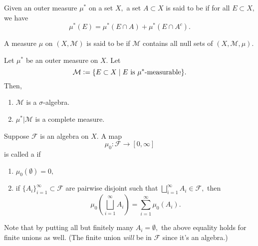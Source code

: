 \documentclass[12pt]{article}	%
\begin{document}
\begin{defn}[$\mu^*$-measurable]
	Given an outer measure $\mu^*$ on a set $X,$ a set $A \subset X$ is said to be  if for all $E \subset X,$ we have
	\begin{equation*} 
		\mu^*(E) = \mu^*(E \cap A) + \mu^*(E \cap A^c).
	\end{equation*}
\end{defn}

\begin{defn}
	A measure $\mu$ on $(X, \mathcal{M})$ is said to be  if $\mathcal{M}$ contains all null sets of $(X, \mathcal{M}, \mu).$
\end{defn}

\begin{thm}[Carathéodory]
	Let $\mu^*$ be an outer measure on $X.$ Let
	\begin{equation*} 
		\mathcal{M} \vcentcolon= \{E \subset X \mid E \text{ is } \mu^*\text{-measurable}\}.
	\end{equation*}
	Then,
	\begin{enumerate}
		\item $\mathcal{M}$ is a $\sigma$-algebra.
		\item $\mu^*|\mathcal{M}$ is a complete measure.
	\end{enumerate} 
\end{thm}

\begin{defn}
	Suppose $\mathcal{F}$ is an algebra on $X.$ A map
	\begin{equation*} 
		\mu_0 : \mathcal{F} \to [0, \infty]
	\end{equation*}
	is called a  if
	\begin{enumerate}
		\item $\mu_0(\emptyset) = 0,$
		\item if $\{A_i\}_{i = 1}^\infty \subset \mathcal{F}$ are pairwise disjoint such that $\bigsqcup_{i = 1}^\infty A_i \in \mathcal{F},$ then
		\begin{equation*} 
			\mu_0\left(\bigsqcup_{i = 1}^\infty A_i\right) = \sum_{i = 1}^{\infty} \mu_0(A_i).
		\end{equation*}
	\end{enumerate}
\end{defn}
Note that by putting all but finitely many $A_i = \emptyset,$ the above equality holds for finite unions as well. (The finite union \emph{will} be in $\mathcal{F}$ since it's an algebra.)
\end{document}
